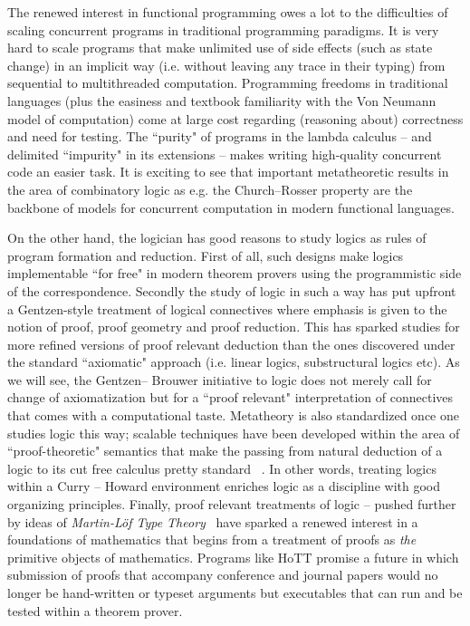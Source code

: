 The renewed interest in functional programming owes a lot to the
 difficulties of scaling concurrent programs in traditional programming paradigms. 
 It is very hard  to scale programs that make unlimited use of side effects 
 (such as state change) in an implicit way (i.e. without leaving any trace in their typing)
  from sequential to  multithreaded computation. Programming freedoms in traditional 
  languages (plus the easiness and textbook familiarity with the Von Neumann model of 
  computation) come at large cost regarding  (reasoning about) 
  correctness and need for testing. The ``purity" of
   programs in the lambda calculus -- and delimited ``impurity" in its extensions -- makes 
   writing high-quality concurrent code an easier task. It is exciting to see that important metatheoretic results in the area of combinatory logic as e.g. the Church--Rosser 
   property are the backbone of models for concurrent computation in modern functional languages. 



On the other hand, the logician has good reasons to study logics as rules of program formation and reduction. First of all, such designs make logics implementable ``for free"
in modern theorem provers using the programmistic side of the correspondence. Secondly the study of logic in such a way has put upfront a  Gentzen-style treatment of logical connectives where emphasis is given to the notion of proof, proof geometry and proof reduction. This  has sparked studies for more refined versions of proof relevant deduction  than the ones discovered under the standard ``axiomatic" approach (i.e. linear logics, substructural logics etc). As we will see, the Gentzen-- Brouwer initiative to  logic  does not merely call for change of axiomatization but for a ``proof relevant" interpretation of connectives that comes with a computational taste. Metatheory is also standardized once one studies logic this way;  scalable techniques have been developed within the area of ``proof-theoretic" semantics that make the passing from  natural deduction of a logic to its cut free calculus pretty standard ~\cite{Sieg1998,pfenning2000structural}. 
In other words, treating logics within a Curry -- Howard environment 
enriches logic as a discipline with good organizing principles. 
Finally, proof relevant treatments of logic -- pushed further by ideas of 
\emph{Martin-L\"{o}f Type Theory}~\cite{martin1984intuitionistic} 
have sparked  a renewed interest in a foundations of mathematics that begins from 
a  treatment of proofs as \textit{the} primitive objects of mathematics. 
Programs like   \ac{HoTT} promise  a future in which submission 
of proofs that accompany conference and journal papers would no 
longer be hand-written or typeset arguments but executables that can
 run and be tested within a theorem prover.

